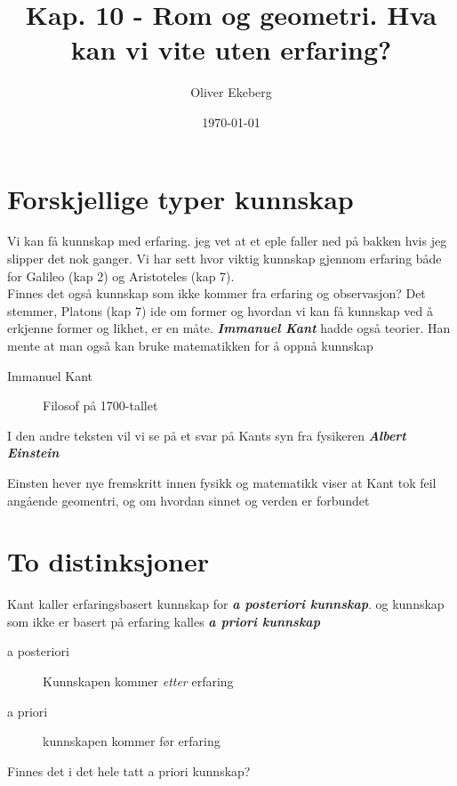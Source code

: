 \documentclass[11pt, a4paper]{article}
\title{Kap. 10 - Rom og geometri. Hva kan vi vite uten erfaring?}
\author{Oliver Ekeberg}
\date{\today}
\begin{document}
\maketitle

\tableofcontents


\section{Forskjellige typer kunnskap}


Vi kan få kunnskap med erfaring. jeg vet at et eple faller ned på bakken hvis jeg slipper det nok ganger. Vi har sett hvor viktig kunnskap gjennom erfaring både for Galileo (kap 2) og Aristoteles (kap 7).\\

Finnes det også kunnskap som ikke kommer fra erfaring og observasjon? Det stemmer, Platons (kap 7) ide om former og hvordan vi kan få kunnskap ved å erkjenne former og likhet, er en måte. \textbf{\textit{Immanuel Kant}} hadde også teorier. Han mente at man også kan bruke matematikken for å oppnå kunnskap \\

\begin{description}
    \item[Immanuel Kant] Filosof på 1700-tallet 
\end{description}


I den andre teksten vil vi se på et svar på Kants syn fra fysikeren \textbf{\textit{Albert Einstein}}

Einsten hever nye fremskritt innen fysikk og matematikk viser at Kant tok feil angående geomentri, og om hvordan sinnet og verden er forbundet

\section{To distinksjoner}

Kant kaller erfaringsbasert kunnskap for \textbf{\textit{a posteriori kunnskap}}. og kunnskap som ikke er basert på erfaring kalles \textbf{\textit{a priori kunnskap}}

\begin{description}
    \item[a posteriori] Kunnskapen kommer \textit{etter} erfaring
    \item[a priori] kunnskapen kommer før erfaring  
\end{description}

Finnes det i det hele tatt a priori kunnskap?
\end{document}
